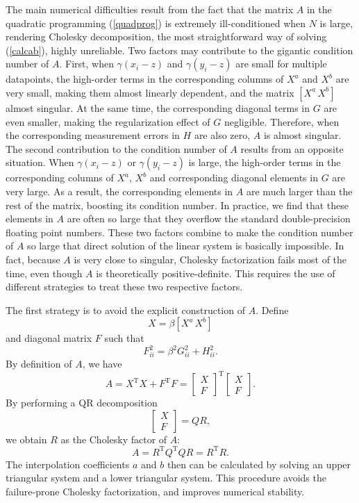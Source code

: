 The main numerical difficulties result from the fact that the matrix $A$
in the quadratic programming (\ref{quadprog}) is extremely ill-conditioned
when $N$ is large, rendering Cholesky decomposition, the most straightforward
way of solving (\ref{calcab}), highly unreliable.  Two factors may contribute
to the gigantic condition number of $A$.  First, when $\gamma (x_i-z)$ and
$\gamma (y_i-z)$ are small for multiple datapoints, the high-order terms in
the corresponding columns of $X^a$ and $X^b$ are very small, making them
almost linearly dependent, and the matrix $[X^a\,X^b]$ almost singular.
At the same time, the corresponding diagonal terms in $G$ are even smaller,
making the regularization effect of $G$ negligible.  Therefore, when
the corresponding measurement errors in $H$ are also zero,
$A$ is almost singular.
The second contribution to the condition number of $A$ results from an
opposite situation.  When $\gamma (x_i-z)$ or $\gamma (y_i-z)$ is large,
the high-order terms in the corresponding columns of $X^a$, $X^b$ and
corresponding diagonal elements in $G$ are very large.  As a result,
the corresponding elements in $A$ are much larger than the rest of the matrix,
boosting its condition number.  In practice, we find that these elements in
$A$ are often so large that they overflow the standard double-precision
floating point numbers.  These two factors combine to make the condition number
of $A$ so large that direct solution of the linear system is basically 
impossible.
In fact, because $A$ is very close to singular, Cholesky factorization fails
most of the time, even though $A$ is theoretically positive-definite.
This requires the use of different strategies to treat these two respective
factors.

The first strategy is to avoid the explicit construction of $A$.  Define
\[ X = \beta [X^a\,X^b] \]
and diagonal matrix $F$ such that
\[ F_{ii}^2 = \beta^2 G_{ii}^2 + H_{ii}^2 .\]
By definition of $A$, we have
\[ A = X^{\mathrm T} X + F^{\mathrm T} F
 = \left[\begin{array}{c} X \\ F\end{array}\right]^{\mathrm T}
   \left[\begin{array}{c} X \\ F\end{array}\right] .\]
By performing a QR decomposition
\begin{equation} \label{qr_decomp}
\left[\begin{array}{c} X \\ F\end{array}\right] = Q R ,
\end{equation}
we obtain $R$ as the Cholesky factor of $A$:
\[ A = R^{\mathrm T} Q^{\mathrm T} Q R = R^{\mathrm T} R .\]
The interpolation coefficients $a$ and $b$ then can be calculated by solving
an upper triangular system and a lower triangular system.  This procedure
avoids the failure-prone Cholesky factorization, and improves numerical
stability.

